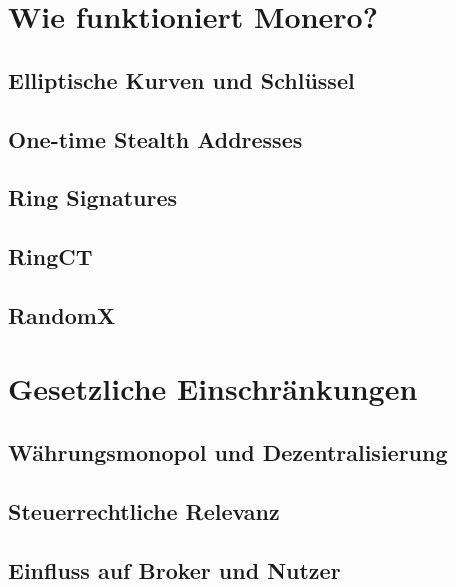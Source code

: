 \chapter{Wie funktioniert Monero?} \label{tech}

\section{Elliptische Kurven und Schlüssel}

\section{One-time Stealth Addresses}

\section{Ring Signatures}

\section{RingCT}

\section{RandomX}

\chapter{Gesetzliche Einschränkungen} \label{legal}

\section{Währungsmonopol und Dezentralisierung}

\section{Steuerrechtliche Relevanz}

\section{Einfluss auf Broker und Nutzer}